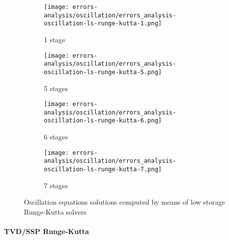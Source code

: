 \documentclass[pdftex,preprint,3p,times,numbers]{elsarticle}
\begin{document}
\begin{figure}[!ht]
  \centering
  \begin{subfigure}[b]{0.45\textwidth}
    \centering
    \texttt{[image: errors-analysis/oscillation/errors\_analysis-oscillation-ls-runge-kutta-1.png]}
    \caption{1 stage}\label{fig:results-oscillation-ls-runge-kutta-1}
  \end{subfigure}\quad%
  \begin{subfigure}[b]{0.45\textwidth}
    \centering
    \texttt{[image: errors-analysis/oscillation/errors\_analysis-oscillation-ls-runge-kutta-5.png]}
    \caption{5 stages}\label{fig:results-oscillation-ls-runge-kutta-5}
  \end{subfigure}
  \begin{subfigure}[b]{0.45\textwidth}
    \centering
    \texttt{[image: errors-analysis/oscillation/errors\_analysis-oscillation-ls-runge-kutta-6.png]}
    \caption{6 stages}\label{fig:results-oscillation-ls-runge-kutta-6}
  \end{subfigure}\quad%
  \begin{subfigure}[b]{0.45\textwidth}
    \centering
    \texttt{[image: errors-analysis/oscillation/errors\_analysis-oscillation-ls-runge-kutta-7.png]}
    \caption{7 stages}\label{fig:results-oscillation-ls-runge-kutta-7}
  \end{subfigure}
  \caption{Oscillation equations solutions computed by means of low storage Runge-Kutta solvers}\label{fig:results-oscillation-ls-runge-kutta}
\end{figure}

\paragraph{TVD/SSP Runge-Kutta}
\end{document}
